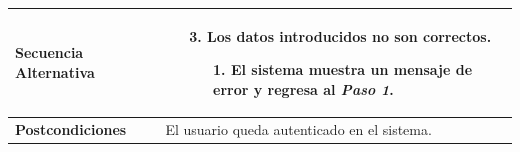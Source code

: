 \begin{longtable}{| p{4cm} | p{10cm} |}
\hline
\textbf{Secuencia Alternativa} &\mbox{}\par\vspace{-\baselineskip}
\begin{enumerate}[leftmargin=0.9cm, topsep=0.1cm]
\item[3.] Los datos introducidos no son correctos.
	\begin{itemize}
	\item[1.] El sistema muestra un mensaje de error y regresa al \textit{Paso 1}.
	\end{itemize}

\end{enumerate}\\

\hline
\textbf{Postcondiciones} & 
El usuario queda autenticado en el sistema.\\
\hline
\end{longtable}




\newpage
